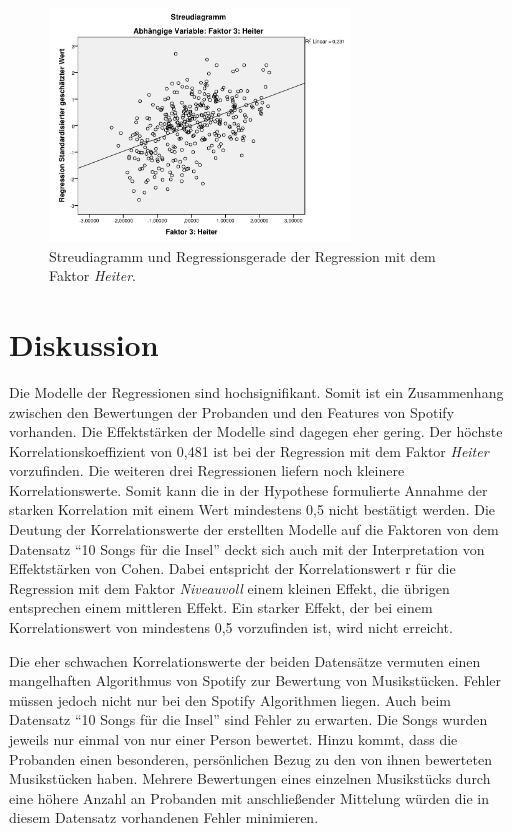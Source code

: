 \begin{figure}[hbt]
    \begin{center}
        \includegraphics[width=8cm]{images/StreudiagrammFak3.pdf}
    \end{center}
    \caption{Streudiagramm und Regressionsgerade der Regression mit dem Faktor \textit{Heiter}.}
    \label{fig:Faktor3}
\end{figure}

\section*{Diskussion}
\label{sec:Diskussion}


Die Modelle der Regressionen sind hochsignifikant.
Somit ist ein Zusammenhang zwischen den Bewertungen der Probanden und den Features von Spotify vorhanden.
Die Effektstärken der Modelle sind dagegen eher gering. 
Der höchste Korrelationskoeffizient von 0,481 ist bei der Regression mit dem Faktor \textit{Heiter} vorzufinden. Die weiteren drei Regressionen liefern noch kleinere Korrelationswerte.
Somit kann die in der Hypothese formulierte Annahme der starken Korrelation mit einem Wert mindestens 0,5 nicht bestätigt werden. 
Die Deutung der Korrelationswerte der erstellten Modelle auf die Faktoren von dem Datensatz ``10 Songs für die Insel'' deckt sich auch mit der Interpretation von Effektstärken von Cohen.
Dabei entspricht der Korrelationswert r für die Regression mit dem Faktor \textit{Niveauvoll} einem kleinen Effekt, die übrigen entsprechen einem mittleren Effekt. Ein starker Effekt, der bei einem Korrelationswert von mindestens 0,5 vorzufinden ist, wird nicht erreicht.

Die eher schwachen Korrelationswerte der beiden Datensätze vermuten einen mangelhaften Algorithmus von Spotify zur Bewertung von Musikstücken.
Fehler müssen jedoch nicht nur bei den Spotify Algorithmen liegen.
Auch beim Datensatz ``10 Songs für die Insel'' sind Fehler zu erwarten.
Die Songs wurden jeweils nur einmal von nur einer Person bewertet.
Hinzu kommt, dass die Probanden einen besonderen, persönlichen Bezug zu den von ihnen bewerteten Musikstücken haben.
Mehrere Bewertungen eines einzelnen Musikstücks durch eine höhere Anzahl an Probanden mit anschließender Mittelung würden die in diesem Datensatz vorhandenen Fehler minimieren.

